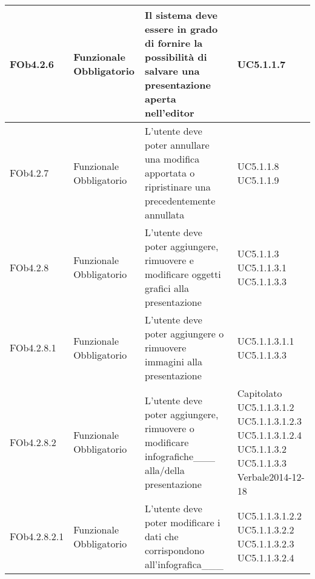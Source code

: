 \begin{longtable}{|l|p{2.5cm}|p{5cm}|p{3.5cm}|}
\hline
FOb4.2.6 & Funzionale \linebreak Obbligatorio & Il sistema deve essere in grado di fornire la possibilità di salvare una presentazione aperta nell'editor & UC5.1.1.7 \linebreak  \\
\hline
FOb4.2.7 & Funzionale \linebreak Obbligatorio & L'utente deve poter annullare una modifica apportata o ripristinare una precedentemente annullata & UC5.1.1.8 \linebreak  UC5.1.1.9 \linebreak  \\
\hline
FOb4.2.8 & Funzionale \linebreak Obbligatorio & L'utente deve poter aggiungere, rimuovere e modificare oggetti grafici alla presentazione & UC5.1.1.3 \linebreak  UC5.1.1.3.1 \linebreak  UC5.1.1.3.3 \linebreak  \\
\hline
FOb4.2.8.1 & Funzionale \linebreak Obbligatorio & L'utente deve poter aggiungere o rimuovere immagini alla presentazione & UC5.1.1.3.1.1 \linebreak  UC5.1.1.3.3 \linebreak  \\
\hline
FOb4.2.8.2 & Funzionale \linebreak Obbligatorio & L'utente deve poter aggiungere, rimuovere o modificare infografiche___ alla/della presentazione & Capitolato \linebreak  UC5.1.1.3.1.2 \linebreak  UC5.1.1.3.1.2.3 \linebreak  UC5.1.1.3.1.2.4 \linebreak  UC5.1.1.3.2 \linebreak  UC5.1.1.3.3 \linebreak  Verbale2014-12-18 \linebreak  \\
\hline
FOb4.2.8.2.1 & Funzionale \linebreak Obbligatorio & L'utente deve poter modificare i dati che corrispondono all'infografica___ & UC5.1.1.3.1.2.2 \linebreak  UC5.1.1.3.2.2 \linebreak  UC5.1.1.3.2.3 \linebreak  UC5.1.1.3.2.4 \linebreak  \\

\end{longtable}
